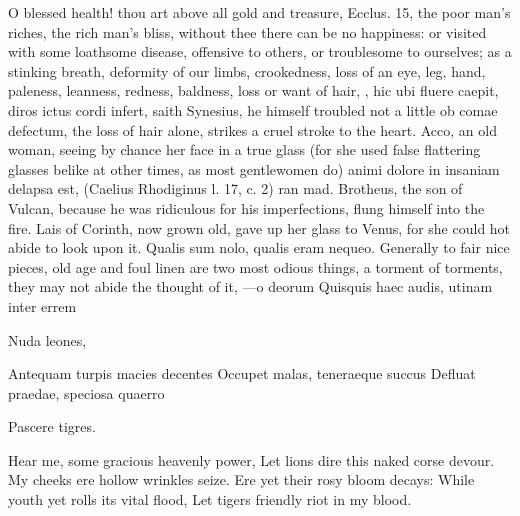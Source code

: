 {{O blessed health! thou art above all gold and treasure, Ecclus. 
15, the poor man's riches, the rich man's bliss, without thee there can
be no happiness: or visited with some loathsome disease, offensive to
others, or troublesome to ourselves; as a stinking breath, deformity of
our limbs, crookedness, loss of an eye, leg, hand, paleness, leanness,
redness, baldness, loss or want of hair, \etc{}, hic ubi fluere caepit,
diros ictus cordi infert, saith Synesius, he himself troubled not
a little ob comae defectum, the loss of hair alone, strikes a cruel
stroke to the heart. Acco, an old woman, seeing by chance her face in a
true glass (for she used false flattering glasses belike at other
times, as most gentlewomen do) animi dolore in insaniam delapsa est,
(Caelius Rhodiginus l. 17, c. 2) ran mad. Brotheus, the son of
Vulcan, because he was ridiculous for his imperfections, flung himself
into the fire. Lais of Corinth, now grown old, gave up her glass to
Venus, for she could hot abide to look upon it. Qualis sum nolo,
qualis eram nequeo. Generally to fair nice pieces, old age and foul
linen are two most odious things, a torment of torments, they may not
abide the thought of it,
---o deorum
Quisquis haec audis, utinam inter errem

Nuda leones,

Antequam turpis macies decentes
Occupet malas, teneraeque succus
Defluat praedae, speciosa quaerro

Pascere tigres.


Hear me, some gracious heavenly power,
Let lions dire this naked corse devour.
My cheeks ere hollow wrinkles seize.
Ere yet their rosy bloom decays:
While youth yet rolls its vital flood,
Let tigers friendly riot in my blood.

}}
